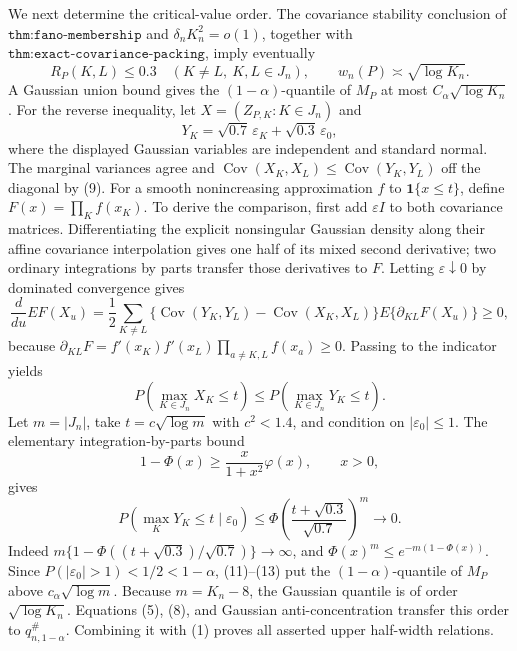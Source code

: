 We next determine the critical-value order.  The covariance stability conclusion of \(\texttt{thm:fano-membership}\) and \(\delta_nK_n^2=o(1)\), together with \(\texttt{thm:exact-covariance-packing}\), imply eventually
\[
 R_P(K,L)\leq0.3\quad(K\neq L,\ K,L\in J_n),
 \qquad w_n(P)\asymp\sqrt{\log K_n}.                                            \tag{9}
\]
A Gaussian union bound gives the \((1-\alpha)\)-quantile of \(M_P\) at most \(C_\alpha\sqrt{\log K_n}\).  For the reverse inequality, let \(X=(Z_{P,K}:K\in J_n)\) and
\[
 Y_K=\sqrt{0.7}\,\varepsilon_K+\sqrt{0.3}\,\varepsilon_0,
\]
where the displayed Gaussian variables are independent and standard normal.  The marginal variances agree and \(\operatorname{Cov}(X_K,X_L)\leq\operatorname{Cov}(Y_K,Y_L)\) off the diagonal by (9).  For a smooth nonincreasing approximation \(f\) to \(\mathbf1\{x\leq t\}\), define \(F(x)=\prod_Kf(x_K)\).  To derive the comparison, first add \(\varepsilon I\) to both covariance matrices.  Differentiating the explicit nonsingular Gaussian density along their affine covariance interpolation gives one half of its mixed second derivative; two ordinary integrations by parts transfer those derivatives to \(F\).  Letting \(\varepsilon\downarrow0\) by dominated convergence gives
\[
 \frac d{du}E F(X_u)=\frac12\sum_{K\neq L}
 \{\operatorname{Cov}(Y_K,Y_L)-\operatorname{Cov}(X_K,X_L)\}
 E\{\partial_{KL}F(X_u)\}\geq0,                                                 \tag{10}
\]
because \(\partial_{KL}F=f'(x_K)f'(x_L)\prod_{a\neq K,L}f(x_a)\geq0\).  Passing to the indicator yields
\[
 P(\max_{K\in J_n}X_K\leq t)\leq P(\max_{K\in J_n}Y_K\leq t).                 \tag{11}
\]
Let \(m=|J_n|\), take \(t=c\sqrt{\log m}\) with \(c^2<1.4\), and condition on \(|\varepsilon_0|\leq1\).  The elementary integration-by-parts bound
\[
 1-\Phi(x)\geq\frac{x}{1+x^2}\varphi(x),\qquad x>0,                            \tag{12}
\]
gives
\[
 P(\max_KY_K\leq t\mid\varepsilon_0)
 \leq\Phi\!\left(\frac{t+\sqrt{0.3}}{\sqrt{0.7}}\right)^m\longrightarrow0.    \tag{13}
\]
Indeed \(m\{1-\Phi((t+\sqrt{0.3})/\sqrt{0.7})\}\to\infty\), and \(\Phi(x)^m\leq e^{-m(1-\Phi(x))}\).  Since \(P(|\varepsilon_0|>1)<1/2<1-\alpha\), (11)--(13) put the \((1-\alpha)\)-quantile of \(M_P\) above \(c_\alpha\sqrt{\log m}\).  Because \(m=K_n-8\), the Gaussian quantile is of order \(\sqrt{\log K_n}\).  Equations (5), (8), and Gaussian anti-concentration transfer this order to \(q_{n,1-\alpha}^{\#}\).  Combining it with (1) proves all asserted upper half-width relations.

